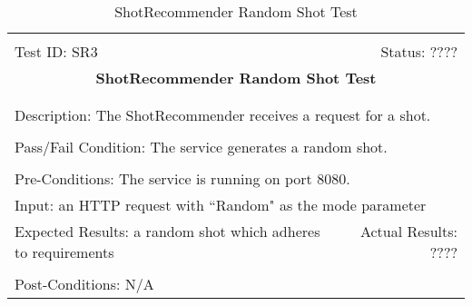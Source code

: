 \documentclass[11pt]{article}
\begin{document}
\begin{center}
\begin{table}[H]
\begin{tabular}{|l r|}\hline&\\[-2mm]
	Test ID: SR3	&Status: ????\\[-3mm]
	\multicolumn{2}{|c|}{\textbf{\large{ShotRecommender Random Shot Test}}}\\&\\\hline&\\[-3mm]
	\multicolumn{2}{|p{\textwidth}|}{Description: The ShotRecommender receives a request for a shot.}\\[1mm]\hline&\\[-3mm]
	\multicolumn{2}{|p{\textwidth}|}{Pass/Fail Condition: The service generates a random shot.}\\[1mm]\hline&\\[-3mm]
	\multicolumn{2}{|p{\textwidth}|}{Pre-Conditions: The service is running on port 8080.}\\[4mm]
	\multicolumn{2}{|p{\textwidth}|}{Input: an HTTP request with ``Random" as the mode parameter}\\[2mm]\hline
	\multicolumn{1}{|p{0.49\textwidth}}{Expected Results: a random shot which adheres to requirements}	&\multicolumn{1}{|p{0.45\textwidth}|}{Actual Results: ????}\\\hline&\\[-3mm]
	\multicolumn{2}{|p{\textwidth}|}{Post-Conditions: N/A}\\\hline
\end{tabular}
\caption{ShotRecommender Random Shot Test}
\end{table}
\end{center}
\end{document}
